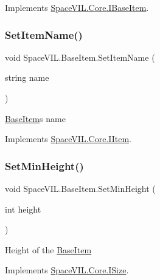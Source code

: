 Implements \mbox{\hyperlink{interface_space_v_i_l_1_1_core_1_1_i_base_item}{Space\+V\+I\+L.\+Core.\+I\+Base\+Item}}.

\mbox{\label{class_space_v_i_l_1_1_base_item_a10bc09b650b0e0ed08536b402beb6813}} 
\subsubsection{\texorpdfstring{Set\+Item\+Name()}{SetItemName()}}
{\footnotesize\ttfamily void Space\+V\+I\+L.\+Base\+Item.\+Set\+Item\+Name (\begin{DoxyParamCaption}\item[{string}]{name }\end{DoxyParamCaption})}



\mbox{\hyperlink{class_space_v_i_l_1_1_base_item}{Base\+Item}}\textquotesingle{}s name 



Implements \mbox{\hyperlink{interface_space_v_i_l_1_1_core_1_1_i_item}{Space\+V\+I\+L.\+Core.\+I\+Item}}.

\mbox{\label{class_space_v_i_l_1_1_base_item_a5dbc5edca77a56b7998c8cee6b0e9a3a}} 
\subsubsection{\texorpdfstring{Set\+Min\+Height()}{SetMinHeight()}}
{\footnotesize\ttfamily void Space\+V\+I\+L.\+Base\+Item.\+Set\+Min\+Height (\begin{DoxyParamCaption}\item[{int}]{height }\end{DoxyParamCaption})}



Height of the \mbox{\hyperlink{class_space_v_i_l_1_1_base_item}{Base\+Item}} 



Implements \mbox{\hyperlink{interface_space_v_i_l_1_1_core_1_1_i_size}{Space\+V\+I\+L.\+Core.\+I\+Size}}.

